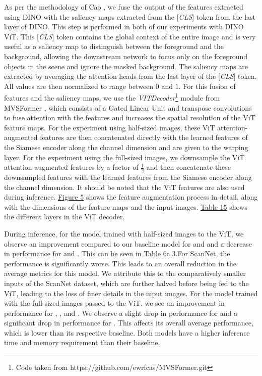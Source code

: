 \begin{enumerate}
    
    As per the methodology of Cao \etal\cite{cao2022mvsformer}, we fuse the output of the features extracted using DINO with the saliency maps extracted from the [\textit{CLS}] token from the last layer of DINO. This step is performed in both of our experiments with DINO ViT. This [\textit{CLS}] token contains the global context of the entire image and is very useful as a saliency map to distinguish between the foreground and the background, allowing the downstream network to focus only on the foreground objects in the scene and ignore the masked background. The saliency maps are extracted by averaging the attention heads from the last layer of the [\textit{CLS}] token. All values are then normalized to range between 0 and 1. For this fusion of features and the saliency maps, we use the \textit{VITDecoder}\footnote{Code taken from https://github.com/ewrfcas/MVSFormer.git} module from MVSFormer \cite{cao2022mvsformer}, which consists of a Gated Linear Unit and transpose convolutions to fuse attention with the features and increases the spatial resolution of the ViT feature maps. For the experiment using half-sized images, these ViT attention-augmented features are then concatenated directly with the learned features of the {\mvsn} Siamese encoder along the channel dimension and are given to the warping layer. For the experiment using the full-sized images, we downsample the ViT attention-augmented features by a factor of \(\frac{1}{2}\) and then concatenate these downsampled features with the learned features from the {\mvsn} Siamese encoder along the channel dimension. It should be noted that the ViT features are also used during inference. \hyperref[fig:vit]{Figure 5} shows the feature augmentation process in detail, along with the dimensions of the feature maps and the input images. \hyperref[tab:arch-vitdec]{Table 15} shows the different layers in the ViT decoder. \par
    
    During inference, for the model trained with half-sized images to the ViT, we observe an improvement compared to our baseline model for {\kitti} and {\ethd} and a decrease in performance for {\dtu} and {\tanksandtemples}. This can be seen in \hyperref[tab:feat-enc]{Table 6}{a.3}.For ScanNet, the performance is significantly worse. This leads to an overall reduction in the average metrics for this model. We attribute this to the comparatively smaller inputs of the ScanNet dataset, which are further halved before being fed to the ViT, leading to the loss of finer details in the input images. For the model trained with the full-sized images passed to the ViT, we see an improvement in performance for {\dtu}, {\scannet}, and {\tanksandtemples}. We observe a slight drop in performance for {\kitti} and a significant drop in performance for {\ethd}. This affects its overall average performance, which is lower than its respective baseline. Both models have a higher inference time and memory requirement than their baseline. 



\end{enumerate}
